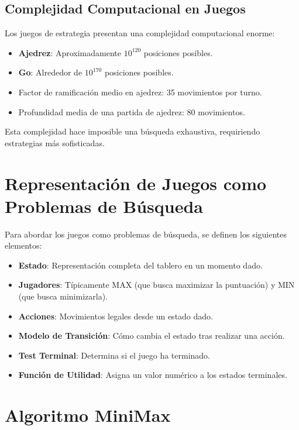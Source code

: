 \documentclass[12pt,a4paper]{report}
\begin{document}
	\subsection{Complejidad Computacional en Juegos}
	
	Los juegos de estrategia presentan una complejidad computacional enorme:
	
	\begin{itemize}
		\item \textbf{Ajedrez}: Aproximadamente $10^{120}$ posiciones posibles.
		\item \textbf{Go}: Alrededor de $10^{170}$ posiciones posibles.
		\item Factor de ramificación medio en ajedrez: 35 movimientos por turno.
		\item Profundidad media de una partida de ajedrez: 80 movimientos.
	\end{itemize}
	
	Esta complejidad hace imposible una búsqueda exhaustiva, requiriendo estrategias más sofisticadas.
	
	\section{Representación de Juegos como Problemas de Búsqueda}
	
	Para abordar los juegos como problemas de búsqueda, se definen los siguientes elementos:
	
	\begin{itemize}
		\item \textbf{Estado}: Representación completa del tablero en un momento dado.
		\item \textbf{Jugadores}: Típicamente MAX (que busca maximizar la puntuación) y MIN (que busca minimizarla).
		\item \textbf{Acciones}: Movimientos legales desde un estado dado.
		\item \textbf{Modelo de Transición}: Cómo cambia el estado tras realizar una acción.
		\item \textbf{Test Terminal}: Determina si el juego ha terminado.
		\item \textbf{Función de Utilidad}: Asigna un valor numérico a los estados terminales.
	\end{itemize}
	
	\section{Algoritmo MiniMax}
	
\end{document}
